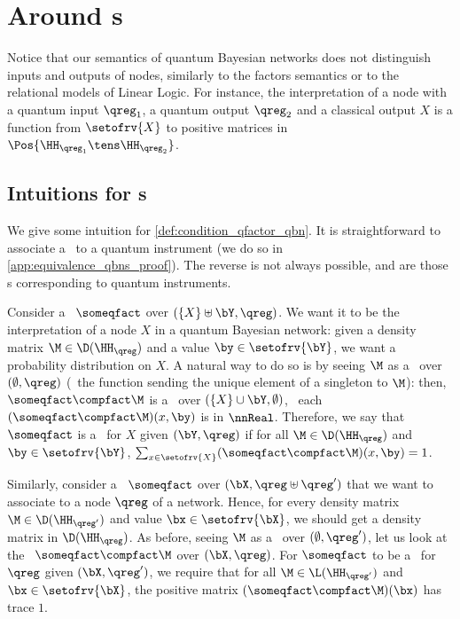 \section{Around \QCPT s}
\label{app:equivalence_qbns}

Notice that our semantics of quantum Bayesian networks does not distinguish inputs and outputs of nodes, similarly to the factors semantics or to the relational models of Linear Logic.
For instance, the interpretation of a node with a quantum input $\qreg_1$, a quantum output $\qreg_2$ and a classical output $X$ is a function from $\setofrv{X}$ to positive matrices in $\Pos{\HH_{\qreg_1} \tens \HH_{\qreg_2}}$.

\subsection{Intuitions for \QCPT s}
\label{sec:QCPT}

We give some intuition for \cref{def:condition_qfactor_qbn}.
It is straightforward to associate a \qfactor\ to a quantum instrument (we do so in \cref{app:equivalence_qbns_proof}).
The reverse is not always possible, and \qCPTs are those \qfactor s corresponding to quantum instruments.

Consider a \qfactor\ $\someqfact$ over $(\{X\}\uplus\bY,\qreg)$.
We want it to be the interpretation of a node $X$ in a quantum Bayesian network: given a density matrix $\M\in\D(\HH_\qreg)$ and a value $\by\in\setofrv{\bY}$, we want a probability distribution on $X$.
A natural way to do so is by seeing $\M$ as a \qfactor\ over $(\emptyset,\qreg)$ (\ie\ the function sending the unique element of a singleton to $\M$): then, $\someqfact\compfact\M$ is a \qfactor\ over $(\{X\}\cup\bY,\emptyset)$, \ie\ each $(\someqfact\compfact\M)(x,\by)$ is in $\nnReal$.
Therefore, we say that $\someqfact$ is a \qCPT\ for $X$ given $(\bY, \qreg)$ if for all $\M\in\D(\HH_\qreg)$ and $\by\in\setofrv{\bY}$, $\sum_{x\in\setofrv{X}}(\someqfact\compfact\M)(x,\by) = 1$.

Similarly, consider a \qfactor\ $\someqfact$ over $(\bX,\qreg\uplus\qreg')$ that we want to associate to a node $\qreg$ of a network.
Hence, for every density matrix $\M\in\D(\HH_{\qreg'})$ and value $\bx\in\setofrv{\bX}$, we should get a density matrix in $\D(\HH_{\qreg})$.
As before, seeing $\M$ as a \qfactor\ over $(\emptyset,\qreg')$, let us look at the \qfactor\ $\someqfact\compfact\M$ over $(\bX,\qreg)$.
For $\someqfact$ to be a \qCPT\ for $\qreg$ given $(\bX,\qreg')$, we require that for all $\M\in\L(\HH_{\qreg'})$ and $\bx\in\setofrv{\bX}$, the positive matrix $(\someqfact\compfact\M)(\bx)$ has trace $1$.

